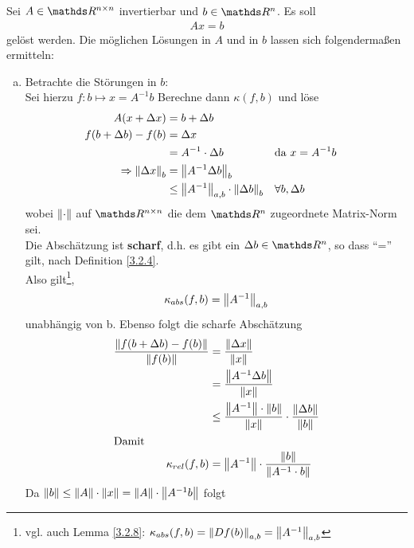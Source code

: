 \begin{Bspe}
  \label{3.2.10}
  Sei $A\in \R^{n\times n}$ invertierbar und $b\in \R^n$. Es soll 
  \begin{gather*}
    Ax =b
  \end{gather*}
  gelöst werden.
  Die möglichen Lösungen in $A$ und in $b$ lassen sich folgendermaßen ermitteln:
  \begin{enumerate}[a)]
  \item Betrachte die Störungen in $b$:\\
    Sei hierzu $f\colon b\mapsto x= A^{-1}b$
    Berechne dann $ \kappa(f,b)$ und löse 
    \begin{align*}
      A(x + \Delta x) &= b+\Delta b \\
      f(b + \Delta b) - f(b) &= \Delta x \\
                      &= A^{-1} \cdot \Delta b && \text{da }x = A^{-1}b \\
      \Rightarrow \left\| \Delta x \right\|_{b}  &= \left\| A^{-1}\Delta b \right\|_{b} \\
                      &\leq \left\| A^{-1} \right\|_{a,b}\cdot \left\| \Delta b \right\|_{b} && \forall b, \Delta b 
    \end{align*}
    wobei $\left\| \cdot \right\| $ auf $\Renn$ die dem $\Ren$ zugeordnete Matrix-Norm sei. \\
    Die Abschätzung ist \textbf{scharf}, 
    d.h. es gibt ein $\Delta b\in \R^n$, so dass \enquote{=} gilt, 
    nach Definition \ref{3.2.4}. \\
    Also gilt\footnote{vgl. auch Lemma \ref{3.2.8}: $\kappa_{abs}(f,b)=\left\| Df(b) \right\|_{a,b}=\left\| A^{-1} \right\|_{a,b}$},
    \begin{gather}
      \kappa_{abs}(f,b) = \left\| A^{-1} \right\|_{a,b} \label{III.2.6}
    \end{gather}
    unabhängig von b.
    Ebenso folgt die scharfe Abschätzung 
    \begin{align}
      \nonumber
      \frac{\left\| 	f(b + \Delta b) - f(b) \right\|}{\left\| f(b) \right\|} 
      &= \frac{\left\| \Delta x \right\|}{\left\| x \right\|}\\ \nonumber
      &= \frac{\left\| A^{-1}\Delta b \right\|}{\left\| x \right\|} \\ \nonumber
      &\leq  \frac{\left\| A^{-1} \right\|\cdot \left\| b \right\|}{\left\| x \right\|} \cdot \frac{\left\| \Delta b \right\|}{\left\| b \right\|} \\
      \intertext{Damit}
      \kappa_{rel} (f,b) 
      &= \left\| A^{-1} \right\|\cdot\frac{\left\| b \right\|}{\left\| A^{-1}\cdot b \right\|}
        \label{III.2.7}
    \end{align}
    Da $\left\| b \right\| \leq \left\| A \right\|\cdot\left\| x \right\| = \left\| A \right\|\cdot \left\| A^{-1}b \right\|$ folgt

\end{enumerate}
\end{Bspe}
